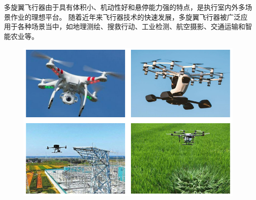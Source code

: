 \documentclass[
  type=master
]{gdutthesis}
\begin{document}

\gduttableofcontents

\mainmatter


多旋翼飞行器由于具有体积小、机动性好和悬停能力强的特点，是执行室内外多场景作业的理想平台。
随着近年来飞行器技术的快速发展，多旋翼飞行器被广泛应用于各种场景当中，如地理测绘、搜救行动、工业检测、航空摄影、交通运输和智能农业等\cite{zhang2022online,mucher2022detection,singh2022intelligent}。
\begin{figure}[H]
	\centering
	\includegraphics[width=1.0\textwidth]{微信图片_20220506224939.png}
	\label{fig:Multirotor}
\end{figure}
\end{document}
